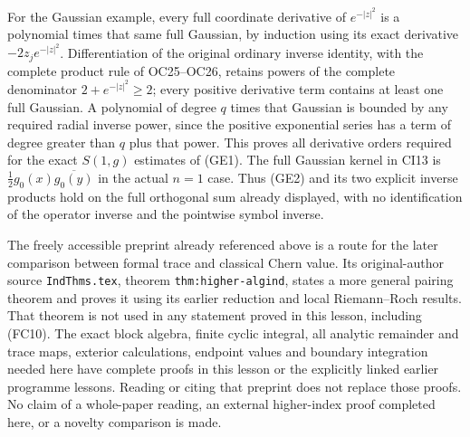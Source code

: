 \documentclass[
  11pt,
]{article}
\begin{document}
For the Gaussian example, every full coordinate derivative of
\(e^{-|z|^2}\) is a polynomial times that same full Gaussian, by
induction using its exact derivative \(-2z_j e^{-|z|^2}\).
Differentiation of the original ordinary inverse identity, with the
complete product rule of OC25--OC26, retains powers of the complete
denominator \(2+e^{-|z|^2}\ge2\); every positive derivative term
contains at least one full Gaussian. A polynomial of degree \(q\) times
that Gaussian is bounded by any required radial inverse power, since the
positive exponential series has a term of degree greater than \(q\) plus
that power. This proves all derivative orders required for the exact
\(S(1,g)\) estimates of (GE1). The full Gaussian kernel in CI13 is
\(\frac12g_0(x)\overline{g_0(y)}\) in the actual \(n=1\) case. Thus
(GE2) and its two explicit inverse products hold on the full orthogonal
sum already displayed, with no identification of the operator inverse
and the pointwise symbol inverse.

The freely accessible preprint already referenced above is a route for
the later comparison between formal trace and classical Chern value. Its
original-author source \texttt{IndThms.tex}, theorem
\texttt{thm:higher-algind}, states a more general pairing theorem and
proves it using its earlier reduction and local Riemann--Roch results.
That theorem is not used in any statement proved in this lesson,
including (FC10). The exact block algebra, finite cyclic integral, all
analytic remainder and trace maps, exterior calculations, endpoint
values and boundary integration needed here have complete proofs in this
lesson or the explicitly linked earlier programme lessons. Reading or
citing that preprint does not replace those proofs. No claim of a
whole-paper reading, an external higher-index proof completed here, or a
novelty comparison is made.
\end{document}
